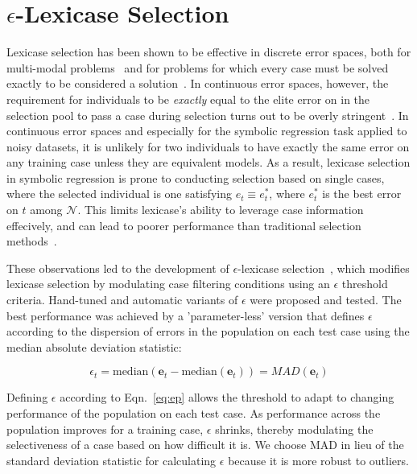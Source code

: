 \documentclass[twoside]{article}
\begin{document}
\section{{\large $\epsilon$}-Lexicase Selection}\label{s:2}

Lexicase selection has been shown to be effective in discrete error spaces, both for multi-modal problems~\citep{spector_assessment_2012} and for problems for which every case must be solved exactly to be considered a solution~\citep{helmuth_solving_2014}. In continuous error spaces, however, the requirement for individuals to be {\it exactly} equal to the elite error on in the selection pool to pass a case during selection turns out to be overly stringent~\citep{la_cava_epsilon-lexicase_2016}. In continuous error spaces and especially for the symbolic regression task applied to noisy datasets, it is unlikely for two individuals to have exactly the same error on any training case unless they are equivalent models. As a result, lexicase selection in symbolic regression is prone to conducting selection based on single cases, where the selected individual is one satisfying $e_t \equiv e^*_t$, where $e^*_t$ is the best error on $t$ among $\mathcal{N}$. This limits lexicase's ability to leverage case information effecively, and can lead to poorer performance than traditional selection methods~\citep{la_cava_epsilon-lexicase_2016}. 

These observations led to the development of $\epsilon$-lexicase selection~\citep{la_cava_epsilon-lexicase_2016}, which modifies lexicase selection by modulating case filtering conditions using an $\epsilon$ threshold criteria. Hand-tuned and automatic variants of $\epsilon$ were proposed and tested. The best performance was achieved by a 'parameter-less' version that defines $\epsilon$ according to the dispersion of errors in the population on each test case using the median absolute deviation statistic:  

\begin{equation}\label{eq:ep}
\epsilon_t = \text{median}(\mathbf{e}_t - \text{median}(\mathbf{e}_t)) = MAD(\mathbf{e}_t)
\end{equation}

Defining $\epsilon$ according to Eqn.~\ref{eq:ep} allows the threshold to adapt to changing performance of the population on each test case. As performance across the population improves for a training case, $\epsilon$ shrinks, thereby modulating the selectiveness of a case based on how difficult it is. We choose MAD in lieu of the standard deviation statistic for calculating $\epsilon$ because it is more robust to outliers. 
\end{document}
